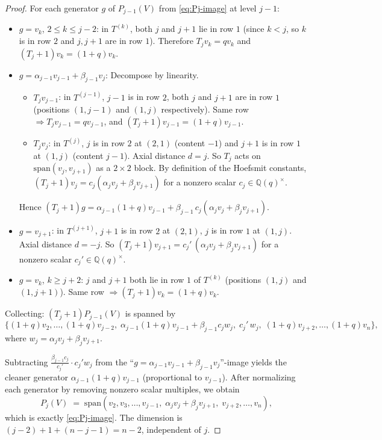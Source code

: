 \documentclass[11pt]{article}
\theoremstyle{definition}
\begin{document}
\begin{proof}
For each generator $g$ of $P_{j-1}(V)$ from \eqref{eq:Pj-image} at level
$j-1$:
\begin{itemize}[topsep=0.3em,itemsep=0.2em,leftmargin=2em]
\item $g = v_k$, $2 \le k \le j-2$: in $T^{(k)}$, both $j$ and $j{+}1$
  lie in row $1$ (since $k < j$, so $k$ is in row $2$ and $j, j{+}1$
  are in row $1$). Therefore $T_j v_k = q v_k$ and $(T_j{+}1) v_k = (1{+}q) v_k$.
\item $g = \alpha_{j-1} v_{j-1} + \beta_{j-1} v_j$:
  Decompose by linearity.
  \begin{itemize}[topsep=0.2em,itemsep=0.1em,leftmargin=2em]
  \item $T_j v_{j-1}$: in $T^{(j-1)}$, $j-1$ is in row $2$, both $j$ and
    $j{+}1$ are in row $1$ (positions $(1, j{-}1)$ and $(1, j)$
    respectively). Same row $\Rightarrow T_j v_{j-1} = q v_{j-1}$, and
    $(T_j{+}1) v_{j-1} = (1{+}q) v_{j-1}$.
  \item $T_j v_j$: in $T^{(j)}$, $j$ is in row $2$ at $(2,1)$ (content $-1$)
    and $j{+}1$ is in row $1$ at $(1, j)$ (content $j-1$). Axial distance
    $d = j$. So $T_j$ acts on $\mathrm{span}(v_j, v_{j+1})$ as a
    $2{\times}2$ block. By definition of the Hoefsmit constants,
    $(T_j{+}1) v_j = c_j(\alpha_j v_j + \beta_j v_{j+1})$ for a nonzero
    scalar $c_j \in \mathbb{Q}(q)^\times$.
  \end{itemize}
  Hence $(T_j{+}1) g = \alpha_{j-1}(1{+}q) v_{j-1}
                      + \beta_{j-1}\, c_j (\alpha_j v_j + \beta_j v_{j+1})$.
\item $g = v_{j+1}$: in $T^{(j+1)}$, $j{+}1$ is in row $2$ at $(2,1)$,
  $j$ is in row $1$ at $(1, j)$. Axial distance $d = -j$. So
  $(T_j{+}1) v_{j+1} = c_j'\, (\alpha_j v_j + \beta_j v_{j+1})$ for a
  nonzero scalar $c_j' \in \mathbb{Q}(q)^\times$.
\item $g = v_k$, $k \ge j+2$: $j$ and $j{+}1$ both lie in row $1$ of
  $T^{(k)}$ (positions $(1, j)$ and $(1, j{+}1)$). Same row $\Rightarrow
  (T_j{+}1) v_k = (1{+}q) v_k$.
\end{itemize}

Collecting: $(T_j{+}1) P_{j-1}(V)$ is spanned by
\[
   \{(1{+}q) v_2, \ldots, (1{+}q) v_{j-2},\; \alpha_{j-1}(1{+}q) v_{j-1}
   + \beta_{j-1} c_j w_j,\; c_j'\, w_j,\; (1{+}q) v_{j+2}, \ldots, (1{+}q) v_n\},
\]
where $w_j = \alpha_j v_j + \beta_j v_{j+1}$.

Subtracting $\frac{\beta_{j-1} c_j}{c_j'} \cdot c_j' w_j$ from the
``$g = \alpha_{j-1}v_{j-1}+\beta_{j-1}v_j$''-image yields the cleaner
generator $\alpha_{j-1}(1{+}q) v_{j-1}$ (proportional to $v_{j-1}$).
After normalizing each generator by removing nonzero scalar multiples,
we obtain
\[
   P_j(V) \;=\; \mathrm{span}(v_2, v_3, \ldots, v_{j-1},\;
                              \alpha_j v_j + \beta_j v_{j+1},\;
                              v_{j+2}, \ldots, v_n),
\]
which is exactly \eqref{eq:Pj-image}. The dimension is
$(j-2) + 1 + (n - j - 1) = n - 2$, independent of $j$.
\end{proof}
\end{document}
